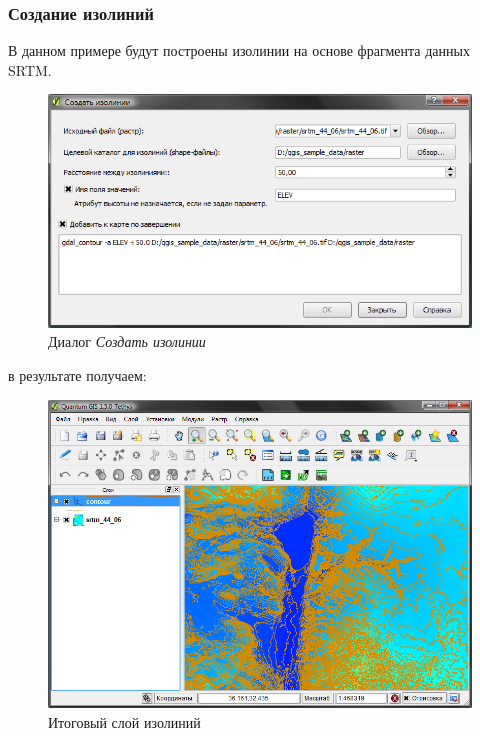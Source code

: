 {\subsubsection{Создание изолиний}
В данном примере будут построены изолинии на основе фрагмента данных SRTM.
\begin{figure}[ht]
   \centering
   \includegraphics[clip=true, width=12cm]{plugins_gdaltools_images/gdal_contour}
   \caption{\label{gdal_contour} Диалог \emph{Создать изолинии} \wincaption}
\end{figure}
в результате получаем:
\begin{figure}[ht]
   \centering
   \includegraphics[clip=true, width=12cm]{plugins_gdaltools_images/qgis_contours}
   \caption{\label{gdal_contour} Итоговый слой изолиний \wincaption}
\end{figure}

}
